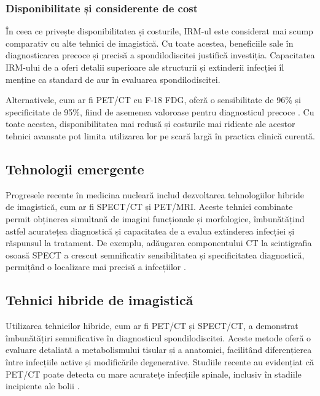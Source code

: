 \documentclass[romanian,12pt,a4paper]{article}
\begin{document}
\subsubsection{Disponibilitate și considerente de cost}

În ceea ce privește disponibilitatea și costurile, IRM-ul este
considerat mai scump comparativ cu alte tehnici de imagistică. Cu toate
acestea, beneficiile sale în diagnosticarea precoce și precisă a
spondilodiscitei justifică investiția. Capacitatea IRM-ului de a oferi
detalii superioare ale structurii și extinderii infecției îl menține ca
standard de aur în evaluarea spondilodiscitei.

Alternativele, cum ar fi PET/CT cu F-18 FDG, oferă o sensibilitate de
96\% și specificitate de 95\%, fiind de asemenea valoroase pentru
diagnosticul precoce \cite{ComparisonDiagnosticValue2017}. Cu toate
acestea, disponibilitatea mai redusă și costurile mai ridicate ale
acestor tehnici avansate pot limita utilizarea lor pe scară largă în
practica clinică curentă.

\subsection{Tehnologii emergente}

Progresele recente în medicina nucleară includ dezvoltarea tehnologiilor
hibride de imagistică, cum ar fi SPECT/CT și PET/MRI. Aceste tehnici
combinate permit obținerea simultană de imagini funcționale și
morfologice, îmbunătățind astfel acuratețea diagnostică și capacitatea
de a evalua extinderea infecției și răspunsul la tratament. De exemplu,
adăugarea componentului CT la scintigrafia osoasă SPECT a crescut
semnificativ sensibilitatea și specificitatea diagnostică, permițând o
localizare mai precisă a infecțiilor
\cite{RadionuclideImagingMusculoskeletal2016}\cite{RoleNuclearMedicine2012}.

\subsection{Tehnici hibride de imagistică}

Utilizarea tehnicilor hibride, cum ar fi PET/CT și SPECT/CT, a
demonstrat îmbunătățiri semnificative în diagnosticul spondilodiscitei.
Aceste metode oferă o evaluare detaliată a metabolismului tisular și a
anatomiei, facilitând diferențierea între infecțiile active și
modificările degenerative. Studiile recente au evidențiat că PET/CT
poate detecta cu mare acuratețe infecțiile spinale, inclusiv în stadiile
incipiente ale bolii
\cite{RadionuclideImagingMusculoskeletal2016}\cite{ImagingAssessmentSpine2024}.
\pagebreak
\end{document}
